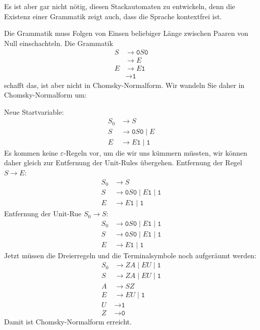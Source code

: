 \begin{loesung}
\begin{center}
\end{center}
Es ist aber gar nicht nötig, diesen Stackautomaten zu entwickeln, denn 
die Existenz einer Grammatik zeigt auch, dass die Sprache kontextfrei ist.

Die Grammatik muss Folgen von Einsen beliebiger Länge zwischen Paaren
von Null einschachteln.
Die Grammatik
\begin{align*}
S&\to \texttt{0}S\texttt{0}
\\
 &\to E
\\
E&\to E\texttt{1}\\
 &\to \texttt{1}
\end{align*}
schafft das, ist aber nicht in Chomsky-Normalform.
Wir wandeln Sie daher in Chomsky-Normalform um:

Neue Startvariable:
\begin{align*}
S_0&\to S
\\
S&\to \texttt{0}S\texttt{0} \;|\; E
\\
E&\to E\texttt{1} \;|\; \texttt{1}
\end{align*}
Es kommen keine $\varepsilon$-Regeln vor, um die wir uns kümmern müssten,
wir können daher gleich zur Entfernung der Unit-Rules übergehen.
Entfernung der Regel $S\to E$:
\begin{align*}
S_0&\to S
\\
S&\to \texttt{0}S\texttt{0} \;|\; E\texttt{1} \;|\; \texttt{1}
\\
E&\to E\texttt{1} \;|\;  \texttt{1}
\end{align*}
Entfernung der Unit-Rue $S_0\to S$:
\begin{align*}
S_0&\to \texttt{0}S\texttt{0} \;|\; E\texttt{1} \;|\; \texttt{1}
\\
S&\to \texttt{0}S\texttt{0} \;|\; E\texttt{1} \;|\; \texttt{1}
\\
E&\to E\texttt{1} \;|\; \texttt{1}
\end{align*}
Jetzt müssen die Dreierregeln und die Terminalsymbole noch aufgeräumt werden:
\begin{align*}
S_0&\to ZA \;|\; EU \;|\; \texttt{1}
\\
S&\to ZA \;|\; EU \;|\; \texttt{1}
\\
A&\to SZ
\\
E&\to EU \;|\; \texttt{1}
\\
U&\to \texttt{1}
\\
Z&\to \texttt{0}
\end{align*}
Damit ist Chomsky-Normalform erreicht.
\end{loesung}

